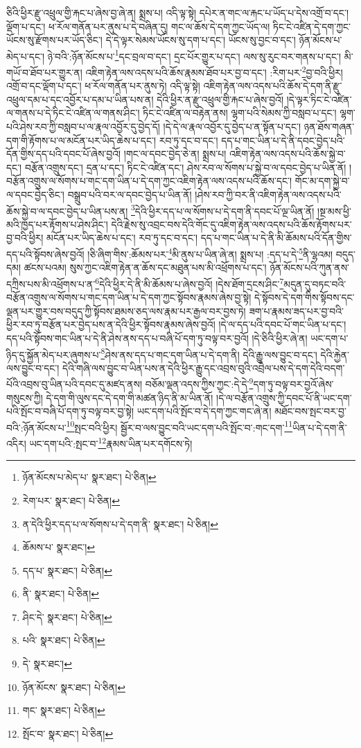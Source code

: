 ཅིའི་ཕྱིར་རྫུ་འཕྲུལ་གྱི་རྐང་པ་ཞེས་བྱ་ཞེ་ན། སྨྲས་པ། འདི་ལྟ་སྟེ། དཔེར་ན་གང་ལ་རྐང་པ་ཡོད་པ་དེས་འགྲོ་བ་དང་། ལྡོག་པ་དང་། ཕ་རོལ་གནོན་པར་ནུས་པ་དེ་བཞིན་དུ། གང་ལ་ཆོས་དེ་དག་ཀྱང་ཡོད་ལ། ཏིང་ངེ་འཛིན་དེ་དག་ཀྱང་ཡོངས་སུ་རྫོགས་པར་ཡོད་ཅིང་། དེ་དེ་ལྟར་སེམས་ཡོངས་སུ་དག་པ་དང་། ཡོངས་སུ་བྱང་བ་དང་། ཉོན་མོངས་པ་མེད་པ་དང་། ཉེ་བའི་:ཉོན་མོངས་པ་\footnote{ཉོན་མོངས་པ་མེད་པ་  སྣར་ཐང་།  པེ་ཅིན། }དང་བྲལ་བ་དང་། དྲང་པོར་གྱུར་པ་དང་། ལས་སུ་རུང་བར་གནས་པ་དང་། མི་གཡོ་བ་ཐོབ་པར་གྱུར་ན། འཇིག་རྟེན་ལས་འདས་པའི་ཆོས་རྣམས་ཐོབ་པར་བྱ་བ་དང་། :རིག་པར་\footnote{རེག་པར་  སྣར་ཐང་།  པེ་ཅིན། }བྱ་བའི་ཕྱིར། འགྲོ་བ་དང་ལྡོག་པ་དང་། ཕ་རོལ་གནོན་པར་ནུས་ཏེ། འདི་ལྟ་སྟེ། འཇིག་རྟེན་ལས་འདས་པའི་ཆོས་དེ་དག་ནི་རྫུ་འཕྲུལ་དམ་པ་དང་འབྱོར་པ་དམ་པ་ཡིན་པས་ན། དེའི་ཕྱིར་ན་རྫུ་འཕྲུལ་གྱི་རྐང་པ་ཞེས་བྱའོ། །དེ་ལྟར་ཏིང་ངེ་འཛིན་ལ་གནས་པ་དེ་ཏིང་ངེ་འཛིན་ལ་གནས་ཤིང་། ཏིང་ངེ་འཛིན་ལ་བརྟེན་ནས། ལྷག་པའི་སེམས་ཀྱི་བསླབ་པ་དང་། ལྷག་པའི་ཤེས་རབ་ཀྱི་བསླབ་པ་ལ་རྣལ་འབྱོར་དུ་བྱེད་དོ། །དེ་དེ་ལ་རྣལ་འབྱོར་དུ་བྱེད་པ་ན་སྟོན་པ་དང་། ཉན་ཐོས་གཞན་དག་གི་རྟོགས་པ་ལ་མངོན་པར་ཡིད་ཆེས་པ་དང་། རབ་ཏུ་དང་བ་དང་། དད་པ་གང་ཡིན་པ་དེ་ནི་དབང་བྱེད་པའི་དོན་གྱིས་དད་པའི་དབང་པོ་ཞེས་བྱའོ། །གང་ལ་དབང་བྱེད་ཅེ་ན། སྨྲས་པ། འཇིག་རྟེན་ལས་འདས་པའི་ཆོས་སྐྱེ་བ་དང་། བརྩོན་འགྲུས་དང་། དྲན་པ་དང་། ཏིང་ངེ་འཛིན་དང་། ཤེས་རབ་ལ་སོགས་པ་སྐྱེ་བ་ལ་དབང་བྱེད་པ་ཡིན་ནོ། །བརྩོན་འགྲུས་ལ་སོགས་པ་གང་དག་ཡིན་པ་དེ་དག་ཀྱང་འཇིག་རྟེན་ལས་འདས་པའི་ཆོས་དང་། གོང་མ་དག་སྐྱེ་བ་ལ་དབང་བྱེད་ཅིང་། བསྒྲུབ་པའི་བར་ལ་དབང་བྱེད་པ་ཡིན་ནོ། །ཤེས་རབ་ཀྱི་བར་ནི་འཇིག་རྟེན་ལས་འདས་པའི་ཆོས་སྐྱེ་བ་ལ་དབང་བྱེད་པ་ཡིན་པས་ན། \footnote{ན་དེའི་ཕྱིར་དད་པ་ལ་སོགས་པ་དེ་དག་ནི་  སྣར་ཐང་།  པེ་ཅིན། }དེའི་ཕྱིར་དད་པ་ལ་སོགས་པ་དེ་དག་ནི་དབང་པོ་ལྔ་ཡིན་ནོ། །སྔ་མས་ཕྱི་མའི་ཁྱད་པར་རྟོགས་པ་ཤེས་ཤིང་། དེའི་རྗེས་སུ་འབྲང་བས་དེའི་གོང་དུ་འཇིག་རྟེན་ལས་འདས་པའི་ཆོས་རྟོགས་པར་བྱ་བའི་ཕྱིར། མངོན་པར་ཡིད་ཆེས་པ་དང་། རབ་ཏུ་དང་བ་དང་། དད་པ་གང་ཡིན་པ་དེ་ནི་མི་ཆོམས་པའི་དོན་གྱིས་དད་པའི་སྟོབས་ཞེས་བྱའོ། །ཅི་ཞིག་གིས་:ཆོམས་པར་\footnote{ཆོམས་པ་  སྣར་ཐང་། }མི་ནུས་པ་ཡིན་ཞེ་ན། སྨྲས་པ། :དད་པ་དེ་\footnote{དད་པ་  སྣར་ཐང་།  པེ་ཅིན། }ནི་ལྷའམ། བདུད་དམ། ཚངས་པའམ། སུས་ཀྱང་འཇིག་རྟེན་ན་ཆོས་དང་མཐུན་པས་མི་འཕྲོགས་པ་དང་། ཉོན་མོངས་པའི་ཀུན་ནས་དཀྲིས་པས་མི་འཕྲོགས་པ་ན་\footnote{ནི་  སྣར་ཐང་།  པེ་ཅིན། }དེའི་ཕྱིར་དེ་ནི་མི་ཆོམས་པ་ཞེས་བྱའོ། །དེས་ཐོག་དྲངས་ཤིང་\footnote{ཤིང་དེ་  སྣར་ཐང་།  པེ་ཅིན། }མདུན་དུ་བཏང་བའི་བརྩོན་འགྲུས་ལ་སོགས་པ་གང་དག་ཡིན་པ་དེ་དག་ཀྱང་སྟོབས་རྣམས་ཞེས་བྱ་སྟེ། དེ་སྟོབས་དེ་དག་གིས་སྟོབས་དང་ལྡན་པར་གྱུར་བས་བདུད་ཀྱི་སྟོབས་ཐམས་ཅད་ལས་རྣམ་པར་རྒྱལ་བར་བྱས་ཏེ། ཟག་པ་རྣམས་ཟད་པར་བྱ་བའི་ཕྱིར་རབ་ཏུ་བརྩོན་པར་བྱེད་པས་ན་དེའི་ཕྱིར་སྟོབས་རྣམས་ཞེས་བྱའོ། །དེ་ལ་དད་པའི་དབང་པོ་གང་ཡིན་པ་དང་། དད་པའི་སྟོབས་གང་ཡིན་པ་དེ་ནི་ཤེས་ནས་དད་པ་བཞི་པོ་དག་ཏུ་བལྟ་བར་བྱའོ། །དེ་ཅིའི་ཕྱིར་ཞེ་ན། ཡང་དག་པ་ཉིད་དུ་སྐྱོན་མེད་པར་ཞུགས་པ་\footnote{པའི་  སྣར་ཐང་།  པེ་ཅིན། }ཤེས་ནས་དད་པ་གང་དག་ཡིན་པ་དེ་དག་ནི། དེའི་རྒྱུ་ལས་བྱུང་བ་དང་། དེའི་རྐྱེན་ལས་བྱུང་བ་དང་། དེའི་གཞི་ལས་བྱུང་བ་ཡིན་པས་ན་དེའི་ཕྱིར་རྒྱུ་དང་འབྲས་བུའི་འབྲེལ་པས་དེ་དག་དེའི་བདག་པོའི་འབྲས་བུ་ཡིན་པའི་དབང་དུ་མཛད་ནས། བཅོམ་ལྡན་འདས་ཀྱིས་ཀྱང་:དེ་དེ་\footnote{དེ་  སྣར་ཐང་། }དག་ཏུ་བལྟ་བར་བྱའོ་ཞེས་གསུངས་ཀྱི། དེ་དག་གི་ལུས་དང་དེ་དག་གི་མཚན་ཉིད་ནི་མ་ཡིན་ནོ། །དེ་ལ་བརྩོན་འགྲུས་ཀྱི་དབང་པོ་ནི་ཡང་དག་པའི་སྤོང་བ་བཞི་པོ་དག་ཏུ་བལྟ་བར་བྱ་སྟེ། ཡང་དག་པའི་སྤོང་བ་དེ་དག་ཀྱང་གང་ཞེ་ན། མཐོང་བས་སྤང་བར་བྱ་བའི་:ཉོན་མོངས་པ་\footnote{ཉོན་མོངས་  སྣར་ཐང་།  པེ་ཅིན། }སྤང་བའི་ཕྱིར། སྦྱོར་བ་ལས་བྱུང་བའི་ཡང་དག་པའི་སྤོང་བ་:གང་དག་\footnote{གང་  སྣར་ཐང་།  པེ་ཅིན། }ཡིན་པ་དེ་དག་ནི་འདིར། ཡང་དག་པའི་:སྤང་བ་\footnote{སྤོང་བ་  སྣར་ཐང་།  པེ་ཅིན། }རྣམས་ཡིན་པར་དགོངས་ཏེ། 